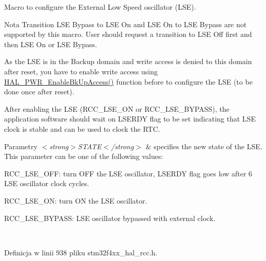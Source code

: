 Macro to configure the External Low Speed oscillator (L\+SE). 

\begin{DoxyNote}{Nota}
Transition L\+SE Bypass to L\+SE On and L\+SE On to L\+SE Bypass are not supported by this macro. User should request a transition to L\+SE Off first and then L\+SE On or L\+SE Bypass. 

As the L\+SE is in the Backup domain and write access is denied to this domain after reset, you have to enable write access using \hyperlink{group___p_w_r___exported___functions___group1_ga3d07cef39bf294db4aed7e06e5dbf9af}{H\+A\+L\+\_\+\+P\+W\+R\+\_\+\+Enable\+Bk\+Up\+Access()} function before to configure the L\+SE (to be done once after reset). 

After enabling the L\+SE (R\+C\+C\+\_\+\+L\+S\+E\+\_\+\+ON or R\+C\+C\+\_\+\+L\+S\+E\+\_\+\+B\+Y\+P\+A\+SS), the application software should wait on L\+S\+E\+R\+DY flag to be set indicating that L\+SE clock is stable and can be used to clock the R\+TC. 
\end{DoxyNote}

\begin{DoxyParams}{Parametry}
{\em $<$strong$>$\+S\+T\+A\+T\+E$<$/strong$>$} & specifies the new state of the L\+SE. This parameter can be one of the following values\+: \begin{DoxyItemize}
\item R\+C\+C\+\_\+\+L\+S\+E\+\_\+\+O\+FF\+: turn O\+FF the L\+SE oscillator, L\+S\+E\+R\+DY flag goes low after 6 L\+SE oscillator clock cycles. \item R\+C\+C\+\_\+\+L\+S\+E\+\_\+\+ON\+: turn ON the L\+SE oscillator. \item R\+C\+C\+\_\+\+L\+S\+E\+\_\+\+B\+Y\+P\+A\+SS\+: L\+SE oscillator bypassed with external clock. \end{DoxyItemize}
\\
\hline
\end{DoxyParams}


Definicja w linii 938 pliku stm32f4xx\+\_\+hal\+\_\+rcc.\+h.

